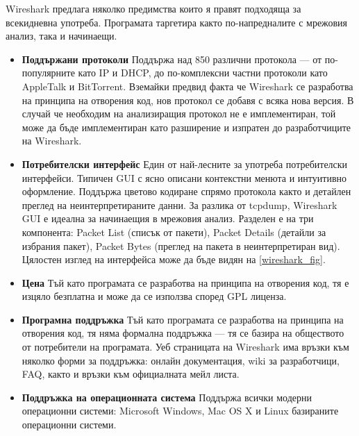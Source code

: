 \documentclass[12pt,a4paper,oneside]{book}
\begin{document}
Wireshark предлага няколко предимства които я правят подходяща за всекидневна
употреба. Програмата таргетира както по-напредналите с мрежовия анализ, така и
начинаещи.

\begin{itemize}
  \item \textbf{Поддържани протоколи} Поддържа над 850 различни протокола --- от
    по-популярните като IP и DHCP, до по-комплексни частни протоколи като
    AppleTalk и BitTorrent. Вземайки предвид факта че Wireshark се разработва на
    принципа на отворения код, нов протокол се добавя с всяка нова версия. В
    случай че необходим на анализиращия протокол не е имплементиран, той може да
    бъде имплементиран като разширение и изпратен до разработчиците на
    Wireshark.
  \item \textbf{Потребителски интерфейс} Един от най-лесните за употреба
    потребителски интерфейси. Типичен GUI с ясно
    описани контекстни менюта и интуитивно оформление. Поддържа цветово кодиране
    спрямо протокола както и детайлен преглед на неинтерпретираните данни. За
    разлика от tcpdump, Wireshark GUI е идеална за начинаещия в мрежовия анализ.
    Разделен е на три компонента: Packet List (списък от пакети),
    Packet Details (детайли за избрания пакет), Packet Bytes (преглед на пакета
    в неинтерпретиран вид). Цялостен изглед на интерфейса може да бъде видян на
    \autoref{wireshark_fig}.
  \item \textbf{Цена} Тъй като програмата се разработва на принципа на отворения
    код, тя е изцяло безплатна и може да се използва според GPL лиценза.
  \item \textbf{Програмна поддръжка} Тъй като програмата се разработва на
    принципа на отворения код, тя няма формална поддръжка --- тя се
    базира на обществото от потребители на програмата. Уеб страницата на
    Wireshark има връзки към няколко форми за поддръжка: онлайн документация,
    wiki за разработчици, FAQ, както и връзки към официалната мейл листа.
  \item \textbf{Поддръжка на операционната система} Поддържа всички модерни
    операционни системи: Microsoft Windows, Mac OS X и Linux базираните
    операционни системи.
\end{itemize}
\end{document}
